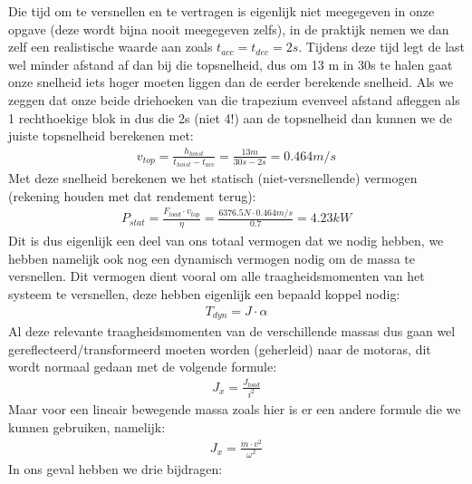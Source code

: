 Die tijd om te versnellen en te vertragen is eigenlijk niet meegegeven in onze opgave (deze
wordt bijna nooit meegegeven zelfs), in de praktijk nemen we dan zelf een realistische
waarde aan zoals $t_{acc} = t_{dec} = 2 s$.
Tijdens deze tijd legt de last wel minder afstand af dan bij die topsnelheid, dus om 13 m
in 30s te halen gaat onze snelheid iets hoger moeten liggen dan de eerder berekende
snelheid.
Als we zeggen dat onze beide driehoeken van die trapezium evenveel afstand afleggen als 1
rechthoekige blok in dus die 2s (niet 4!) aan de topsnelheid dan kunnen we de juiste
topsnelheid berekenen met:
\begin{align*}
 v_{top} = \frac{h_{hoist}}{t_{hoist} - t_{acc}} = \frac{13 m}{30 s - 2 s} = 0.464 m/s
\end{align*}
Met deze snelheid berekenen we het statisch (niet-versnellende) vermogen (rekening houden
met dat rendement terug):
\begin{align*}
 P_{stat} = \frac{F_{load} \cdot v_{top}}{\eta} = \frac{6376.5 N \cdot 0.464 m/s}{0.7} = 4.23 kW
\end{align*}
Dit is dus eigenlijk een deel van ons totaal vermogen dat we nodig hebben, we hebben
namelijk ook nog een dynamisch vermogen nodig om de massa te versnellen.
Dit vermogen dient vooral om alle traagheidsmomenten van het systeem te versnellen, deze
hebben eigenlijk een bepaald koppel nodig:
\begin{align*}
 T_{dyn} = J \cdot \alpha
\end{align*}
Al deze relevante traagheidsmomenten van de verschillende massas dus gaan wel
gereflecteerd/transformeerd moeten worden (geherleid) naar de motoras, dit wordt normaal
gedaan met de volgende formule:
\begin{align*}
 J_{x} = \frac{J_{load}}{i^2}
\end{align*}
Maar voor een lineair bewegende massa zoals hier is er een andere formule die we kunnen
gebruiken, namelijk:
\begin{align*}
    J_{x} = \frac{m \cdot v^2}{\omega^2}
\end{align*}
In ons geval hebben we drie bijdragen:

